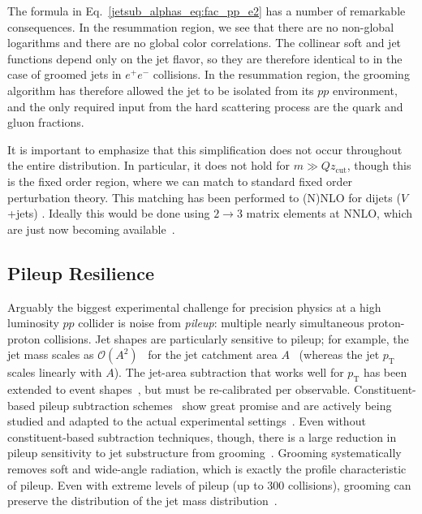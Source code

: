 \documentclass[11pt]{cernrep}
\begin{document}
The formula in Eq.~\ref{jetsub_alphas_eq:fac_pp_e2} has a number of remarkable consequences.
%
In the resummation region, we see that there are no non-global logarithms and there are no global color correlations.
%
The collinear soft and jet functions depend only on the jet flavor, so they are therefore identical to in the case of groomed jets in $e^+e^-$ collisions.
%
In the resummation region, the grooming algorithm has therefore allowed the jet to be isolated from its $pp$ environment, and the only required input from the hard scattering process are the quark and gluon fractions. 

It is important to emphasize that this simplification does not occur throughout the entire distribution.
%
In particular, it does not hold for $m \gg Qz_{\mathrm{cut}} $, though this is the fixed order region, where we can match to standard fixed order perturbation theory.
%
This matching has been performed to (N)NLO for dijets ($V$+jets) \cite{Frye:2016aiz,Marzani:2017kqd,Marzani:2017mva}.
%
Ideally this would be done using $2\to 3$ matrix elements at NNLO, which are just now becoming available~\cite{Gehrmann:2015bfy,Dunbar:2016aux,Badger:2013yda,Badger:2017jhb,Abreu:2017hqn}.

\subsection{Pileup Resilience}

Arguably the biggest experimental challenge for precision physics at a high luminosity $pp$ collider is noise from \textit{pileup}: multiple nearly simultaneous proton-proton collisions.
%
Jet shapes are particularly sensitive to pileup; for example, the jet mass scales as $\mathcal{O}(A^2)$~\cite{Salam:2009jx} for the jet catchment area $A$~\cite{Cacciari:2008gn} (whereas the jet $p_\mathrm{T}$ scales linearly with $A$).
%
The jet-area subtraction that works well for $p_\mathrm{T}$ has been extended to event shapes~\cite{Soyez:2012hv}, but must be re-calibrated per observable.
%
Constituent-based pileup subtraction schemes~\cite{Cacciari:2014gra,Krohn:2013lba,Bertolini:2014bba,Berta:2014eza,Komiske:2017ubm} show great promise and are actively being studied and adapted to the actual experimental settings~\cite{CMS-PAS-JME-14-001,CMS-DP-2015-034,ATLAS-CONF-2017-065,ATL-PHYS-PUB-2017-020,Aad:2015ina}.
%
Even without constituent-based subtraction techniques, though, there is a large reduction in pileup sensitivity to jet substructure from grooming~\cite{CMS-PAS-JME-14-001,Aad:2015rpa,Aad:2015ina,Altheimer:2013yza}.
%
Grooming systematically removes soft and wide-angle radiation, which is exactly the profile characteristic of pileup.
%
Even with extreme levels of pileup (up to 300 collisions), grooming can preserve the distribution of the jet mass distribution~\cite{JetSubstructureECFA2014}. 
\end{document}
